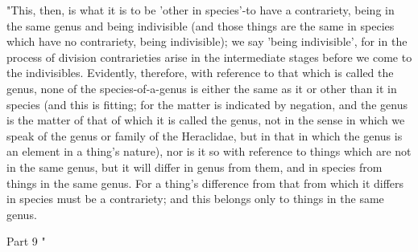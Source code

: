 "This, then, is what it is to be 'other in species'-to have a contrariety,
being in the same genus and being indivisible (and those things are
the same in species which have no contrariety, being indivisible);
we say 'being indivisible', for in the process of division contrarieties
arise in the intermediate stages before we come to the indivisibles.
Evidently, therefore, with reference to that which is called the genus,
none of the species-of-a-genus is either the same as it or other than
it in species (and this is fitting; for the matter is indicated by
negation, and the genus is the matter of that of which it is called
the genus, not in the sense in which we speak of the genus or family
of the Heraclidae, but in that in which the genus is an element in
a thing's nature), nor is it so with reference to things which are
not in the same genus, but it will differ in genus from them, and
in species from things in the same genus. For a thing's difference
from that from which it differs in species must be a contrariety;
and this belongs only to things in the same genus. 

Part 9 "

